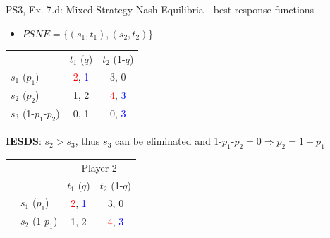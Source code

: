 \begin{frame}{PS3, Ex. 7.d: Mixed Strategy Nash Equilibria - best-response functions}
  \begin{multicols}{2}
    \begin{itemize}
      \item[(d)] $PSNE=\{(s_1,t_1),(s_2,t_2)\}$
    \end{itemize}
    \begin{table}
      \begin{tabular}{l|c|c|}
          \multicolumn{1}{c}{}  & \multicolumn{1}{c}{$t_1$ ($q$)} & \multicolumn{1}{c}{$t_2$ (1-$q$)} \\\cline{2-3}
          $s_1$ ($p_1$)         & \textcolor{red}{2}, \textcolor{blue}{1} & 3, 0 \\\cline{2-3}
          $s_2$ ($p_2$)         & 1, 2 & \textcolor{red}{4}, \textcolor{blue}{3} \\\cline{2-3}
          $s_3$ (1-$p_1$-$p_2$) & 0, 1 & 0, \textcolor{blue}{3} \\\cline{2-3}
      \end{tabular}
    \end{table}
    \textbf{IESDS}: $s_2>s_3$, thus $s_3$ can be eliminated and 1-$p_1$-$p_2=0\Rightarrow p_2=1-p_1$
    \begin{table}
      \begin{tabular}{cl|c|c|}
        & \multicolumn{1}{c}{} & \multicolumn{2}{c}{\color{blue}Player 2}\\
        \parbox[t]{1mm}{}
        &   &  &  \\
        & $s_1$ ($p_1$)  & \textcolor{red}{2}, \textcolor{blue}{1} & 3, 0 \\
        & $s_2$ (1-$p_1$)& 1, 2 & \textcolor{red}{4}, \textcolor{blue}{3} \\
      \end{tabular}
    \end{table}
  \vfill\null \columnbreak
  \vfill\null
  \end{multicols}
\end{frame}
